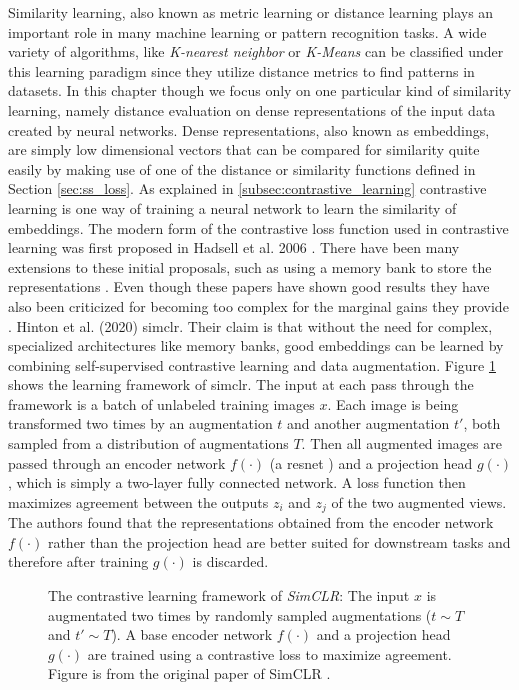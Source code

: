Similarity learning, also known as metric learning or distance learning plays an important role in many machine learning or pattern recognition tasks. A wide variety of algorithms, like \textit{K-nearest neighbor} or \textit{K-Means} can be classified under this learning paradigm since they utilize distance metrics to find patterns in datasets. In this chapter though we focus only on one particular kind of similarity learning, namely distance evaluation on dense representations of the input data created by neural networks. Dense representations, also known as embeddings, are simply low dimensional vectors that can be compared for similarity quite easily by making use of one of the distance or similarity functions defined in Section \ref{sec:ss_loss}. As explained in \ref{subsec:contrastive_learning} contrastive learning is one way of training a neural network to learn the similarity of embeddings. The modern form of the contrastive loss function used in contrastive learning was first proposed in Hadsell et al. 2006 \cite{hadsell06dimensionality}. There have been many extensions to these initial proposals, such as using a memory bank to store the representations \cite{wu2018unsupervised}. Even though these papers have shown good results they have also been criticized for becoming too complex for the marginal gains they provide \cite{chen2020simple}. Hinton et al. (2020) \cite{chen2020simple} \gls{simclr}. Their claim is that without the need for complex, specialized architectures like memory banks, good embeddings can be learned by combining self-supervised contrastive learning and data augmentation. Figure \ref{fig:simclr} shows the learning framework of \gls{simclr}. The input at each pass through the framework is a batch of unlabeled training images $x$. Each image is being transformed two times by an augmentation $t$ and another augmentation $t'$, both sampled from a distribution of augmentations $T$. Then all augmented images are passed through an encoder network $f(\cdot)$ (a \gls{resnet} \cite{he2015deep}) and a projection head $g(\cdot)$, which is simply a two-layer fully connected network. A loss function then maximizes agreement between the outputs $z_i$ and $z_j$ of the two augmented views. The authors found that the representations obtained from the encoder network $f(\cdot)$ rather than the projection head are better suited for downstream tasks and therefore after training $g(\cdot)$ is discarded.

\begin{figure}
    \centering
    
     \caption[SimCLR overview]{The contrastive learning framework of \textit{SimCLR}: The input $x$ is augmentated two times by randomly sampled augmentations ($t \sim T$ and $t' \sim T$). A base encoder network $f(\cdot)$ and a projection head $g(\cdot)$ are trained using a contrastive loss to maximize agreement. Figure is from the original paper of SimCLR \cite{chen2020simple}.}
    \label{fig:simclr}
\end{figure}

